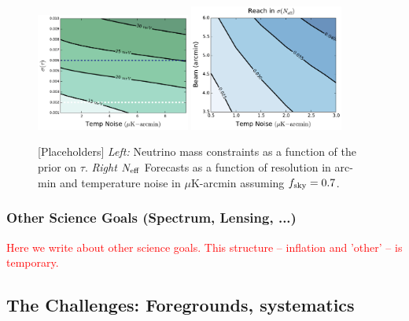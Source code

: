 \documentclass[12pt]{article}
\def\Neff{{N_{\rm eff}}}
\newcommand{\comred}[1]{\textcolor{red}{#1}}
\begin{document}
\begin{figure}[t!]
\begin{center}
\includegraphics[width=0.45\textwidth]{figs/Mnu_tauprior.pdf}
\includegraphics[width=0.45\textwidth]{figs/Neff_space.pdf}
\caption{ [Placeholders] {\it Left:} Neutrino mass constraints as a function of the prior on $\tau$.  {\it Right} $\Neff$ Forecasts as a function of resolution in arc-min and temperature noise in $\mu$K-arcmin assuming $f_{\rm sky} = 0.7$.}
\label{fig:Neff_future}
\end{center}
\end{figure}


\vspace{-0.22in}

\subsubsection{Other Science Goals (Spectrum, Lensing, ...)}

\comred{Here we write about other science goals. This structure -- inflation and 'other' -- is temporary. }

\vspace{-0.05in}

\subsection{The Challenges: Foregrounds, systematics}
\label{sec:foregrounds}

\vspace{-0.05in}
\end{document}
